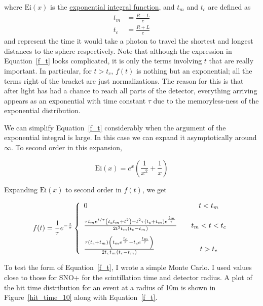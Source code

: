\documentclass{article}
\begin{document}
where $\text{Ei}(x)$ is the
\href{http://en.wikipedia.org/wiki/Exponential_integral}{exponential integral function}, and $t_m$ and $t_c$ are defined as
\begin{align*}
    t_m &= \frac{R-L}{c} \\[2ex]
    t_c &= \frac{R+L}{c}
\end{align*}
and represent the time it would take a photon to travel the shortest and
longest distances to the sphere respectively. Note that although the expression
in Equation~\ref{f_t} looks complicated, it is only the terms involving $t$
that are really important. In particular, for $t > t_c$, $f(t)$ is nothing but
an exponential; all the terms right of the bracket are just normalizations. The
reason for this is that after light has had a chance to reach all parts of the
detector, everything arriving appears as an exponential with time constant
$\tau$ due to the memoryless-ness of the exponential distribution.

We can simplify Equation~\ref{f_t} considerably when the argument of the
exponential integral is large. In this case we can expand it asymptotically
around $\infty$. To second order in this expansion,

\begin{equation*}
    \text{Ei}(x) = e^x \left(\frac{1}{x^2}+\frac{1}{x}\right)
\end{equation*}

Expanding $\text{Ei}(x)$ to second order in $f(t)$, we get

\begin{equation}
    f(t) = \frac{1}{\tau} e^{-\frac{t}{\tau}}\left\{
    \begin{array}{l c}
        0 & \quad t < t_m \\[2ex]

        \frac{\tau  t_m e^{t/\tau } \left(t_c t_m+t^2\right)-t^2 \tau
        \left(t_c+t_m\right) e^{\frac{t_m}{\tau }}}{2 t^2 t_m\left(t_c-t_m\right)}
        & \quad
        t_m < t < t_c \\[2ex]

        \frac{\tau  \left(t_c+t_m\right) \left(t_m e^{\frac{t_c}{\tau }}-t_c
        e^{\frac{t_m}{\tau }}\right)}{2 t_c t_m\left(t_c-t_m\right)}
        & \quad
        t > t_c
    \end{array} \right. \\[2ex]
\end{equation}

To test the form of Equation~\ref{f_t}, I wrote a simple Monte Carlo.  I used
values close to those for SNO+ for the scintillation time and detector radius.
A plot of the hit time distribution for an event at a radius of 10m is shown in
Figure~\ref{hit_time_10} along with Equation~\ref{f_t}.
\end{document}
